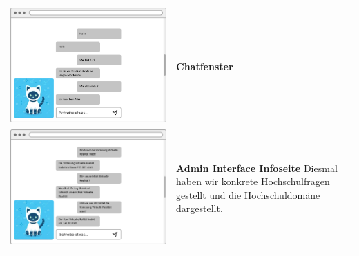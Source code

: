 \begin{tabular}{C{6cm}  L{7cm}}
    \includegraphics[width=\linewidth]{bilder/new vers. UI Design/WebChat/WebChat.png}                      & \textbf{Chatfenster} \newline
                                                                                                                                         \\
    \includegraphics[width=\linewidth]{bilder/new vers. UI Design/WebChat/WebChat Hochschule.png}           & \textbf{Admin Interface Infoseite} \newline
    Diesmal haben wir konkrete Hochschulfragen gestellt und die Hochschuldomäne dargestellt.                                                                    \\

\end{tabular}
